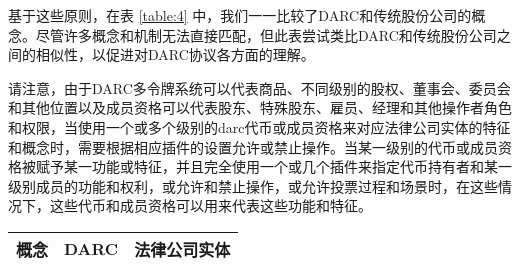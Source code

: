 \documentclass[main.tex]{subfiles}
\begin{document}
基于这些原则，在表 \ref{table:4} 中，我们一一比较了DARC和传统股份公司的概念。尽管许多概念和机制无法直接匹配，但此表尝试类比DARC和传统股份公司之间的相似性，以促进对DARC协议各方面的理解。

请注意，由于DARC多令牌系统可以代表商品、不同级别的股权、董事会、委员会和其他位置以及成员资格可以代表股东、特殊股东、雇员、经理和其他操作者角色和权限，当使用一个或多个级别的darc代币或成员资格来对应法律公司实体的特征和概念时，需要根据相应插件的设置允许或禁止操作。当某一级别的代币或成员资格被赋予某一功能或特征，并且完全使用一个或几个插件来指定代币持有者和某一级别成员的功能和权利，或允许和禁止操作，或允许投票过程和场景时，在这些情况下，这些代币和成员资格可以用来代表这些功能和特征。

\begin{table}[h!]
\centering
\begin{tabular}{| l | l | l|} 
    \hline
    概念 & DARC & 法律公司实体 \\ [0.5ex] 
    \hline\hline


\end{tabular}
\end{table}
\end{document}
